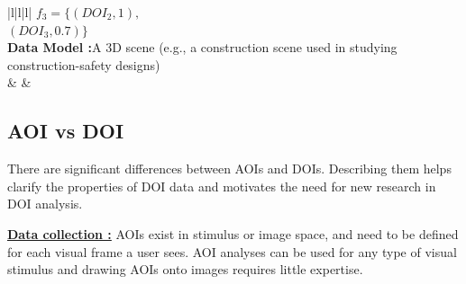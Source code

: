 \begin{table}[htbp]
\begin{tabular}{|l|l|l|}
{							$f_3=\{(DOI_2, 1),$\\$(DOI_3, 0.7)\}$
							}
		\\\hline
		{\textbf{Data Model :}A 3D scene (e.g., a construction scene used in studying construction-safety designs)}\\\hline
		& 									
		&
		\\\hline
		\end{tabular}
		\caption{Examples of DOIs.}
		\label{tab:ExampleDOI}
\end{table} 

\subsection{AOI vs DOI}
\label{sec:AOIvDOI}
There are significant differences between AOIs and DOIs. Describing them helps clarify the properties of DOI data and motivates the need for new research in DOI analysis.

\textbf{\underline{Data collection :}} AOIs exist in stimulus or image space, and need to be defined for each visual frame a user sees. AOI analyses can be used for any type of visual stimulus and drawing AOIs onto images requires little expertise. 

